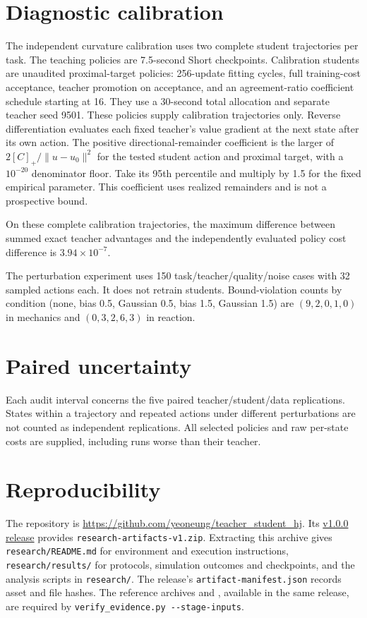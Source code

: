 \section{Diagnostic calibration}\label{app:diagnostics}
The independent curvature calibration uses two complete student trajectories
per task. The teaching policies are 7.5-second Short checkpoints. Calibration
students are unaudited proximal-target policies: 256-update fitting cycles,
full training-cost acceptance, teacher promotion on acceptance, and an
agreement-ratio coefficient schedule starting at 16. They use a 30-second
total allocation and separate teacher seed 9501. These policies supply calibration trajectories only.
Reverse differentiation evaluates each fixed teacher's value gradient at
the next state after its own action. The positive directional-remainder
coefficient is the larger of $2[C]_+/\|u-u_0\|^2$ for the tested student
action and proximal target, with a $10^{-20}$ denominator floor. Take its
95th percentile and multiply by 1.5 for the fixed empirical parameter.
This coefficient uses realized remainders and is not a prospective bound.

On these complete calibration trajectories, the maximum difference between
summed exact teacher advantages and the independently evaluated policy
cost difference is $3.94\times10^{-7}$. 

The perturbation experiment uses 150 task/teacher/quality/noise cases with
32 sampled actions each. It does not retrain students. Bound-violation
counts by condition (none, bias 0.5, Gaussian 0.5, bias 1.5, Gaussian 1.5)
are $(9,2,0,1,0)$ in mechanics and $(0,3,2,6,3)$ in reaction.


\section{Paired uncertainty}\label{app:uncertainty}

Each audit interval concerns the five paired teacher/student/data replications.
States within a trajectory and repeated actions under different perturbations
are not counted as independent replications. All selected policies and raw
per-state costs are supplied, including runs worse than their teacher.

\section{Reproducibility}\label{app:reproducibility}
The repository is
\url{https://github.com/yeoneung/teacher_student_hj}.
Its \href{https://github.com/yeoneung/teacher_student_hj/releases/tag/v1.0.0}{v1.0.0 release}
provides \texttt{research-artifacts-v1.zip}. Extracting this archive gives
\texttt{research/README.md} for environment and execution instructions,
\texttt{research/results/} for protocols, simulation outcomes and
checkpoints, and the analysis scripts in \texttt{research/}.
The release's \texttt{artifact-manifest.json} records asset and file hashes.
The reference archives  and
, available in the same release,
are required by \texttt{verify\_evidence.py -{}-stage-inputs}.

